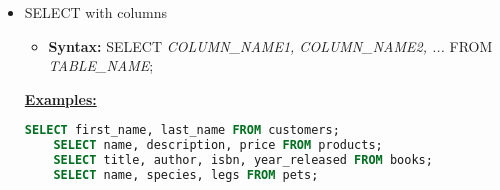 \documentclass[12pt]{article}
\begin{document}
\bigskip

\begin{itemize}
    \item SELECT with columns
    \begin{itemize}
        \item \textbf{Syntax:} SELECT \textit{COLUMN\_NAME1, COLUMN\_NAME2, ...} FROM \textit{TABLE\_NAME};
    \end{itemize}

    \bigskip

    \underline{\textbf{Examples:}}

    \bigskip

    \begin{lstlisting}[language=SQL]
    SELECT first_name, last_name FROM customers;
    SELECT name, description, price FROM products;
    SELECT title, author, isbn, year_released FROM books;
    SELECT name, species, legs FROM pets;
    \end{lstlisting}
\end{itemize}
\end{document}

